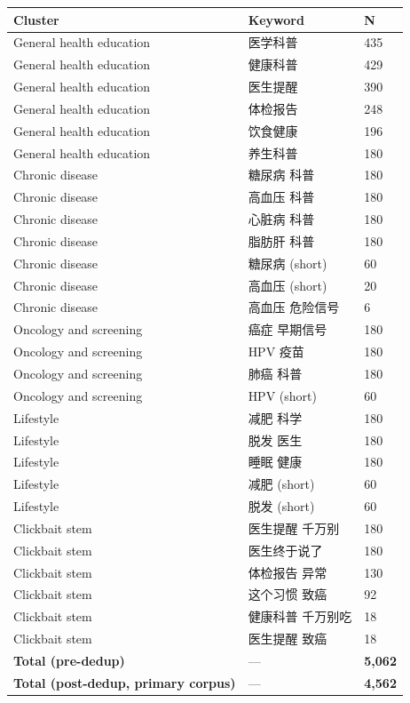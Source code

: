 \documentclass[
  12pt,
]{article}
\begin{document}
\begin{longtable}[]{@{}lll@{}}
\toprule\noalign{}
Cluster & Keyword & N \\
\midrule\noalign{}
\endhead
\bottomrule\noalign{}
\endlastfoot
General health education & 医学科普 & 435 \\
General health education & 健康科普 & 429 \\
General health education & 医生提醒 & 390 \\
General health education & 体检报告 & 248 \\
General health education & 饮食健康 & 196 \\
General health education & 养生科普 & 180 \\
Chronic disease & 糖尿病 科普 & 180 \\
Chronic disease & 高血压 科普 & 180 \\
Chronic disease & 心脏病 科普 & 180 \\
Chronic disease & 脂肪肝 科普 & 180 \\
Chronic disease & 糖尿病 (short) & 60 \\
Chronic disease & 高血压 (short) & 20 \\
Chronic disease & 高血压 危险信号 & 6 \\
Oncology and screening & 癌症 早期信号 & 180 \\
Oncology and screening & HPV 疫苗 & 180 \\
Oncology and screening & 肺癌 科普 & 180 \\
Oncology and screening & HPV (short) & 60 \\
Lifestyle & 减肥 科学 & 180 \\
Lifestyle & 脱发 医生 & 180 \\
Lifestyle & 睡眠 健康 & 180 \\
Lifestyle & 减肥 (short) & 60 \\
Lifestyle & 脱发 (short) & 60 \\
Clickbait stem & 医生提醒 千万别 & 180 \\
Clickbait stem & 医生终于说了 & 180 \\
Clickbait stem & 体检报告 异常 & 130 \\
Clickbait stem & 这个习惯 致癌 & 92 \\
Clickbait stem & 健康科普 千万别吃 & 18 \\
Clickbait stem & 医生提醒 致癌 & 18 \\
\textbf{Total (pre-dedup)} & --- & \textbf{5,062} \\
\textbf{Total (post-dedup, primary corpus)} & --- & \textbf{4,562} \\
\end{longtable}
\end{document}
